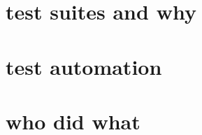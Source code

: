 \documentclass[./Report_main.tex]{subfiles}
\begin{document}
\section{test suites and why}
\section{test automation}
\section{who did what}
\end{document}
